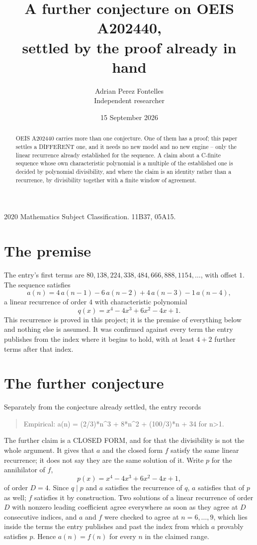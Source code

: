 \documentclass[11pt,a4paper]{article}
\title{A further conjecture on OEIS A202440,\\ \large settled by the proof already in hand}
\author{Adrian Perez Fontelles\\ \small Independent researcher}
\date{15 September 2026}
\theoremstyle{plain}
\theoremstyle{definition}
\begin{document}
\maketitle

\begin{abstract}
OEIS A202440 carries more than one conjecture. One of them has a proof; this paper settles a
DIFFERENT one, and it needs no new model and no new engine -- only the linear recurrence already
established for the sequence. A claim about a C-finite sequence whose own characteristic
polynomial is a multiple of the established one is decided by polynomial divisibility, and where
the claim is an identity rather than a recurrence, by divisibility together with a finite window
of agreement.
\end{abstract}

\noindent\small 2020 Mathematics Subject Classification. 11B37, 05A15.\normalsize

\section{The premise}

The entry's first terms are $80, 138, 224, 338, 484, 666, 888, 1154,\dots$, with offset $1$. The sequence satisfies
\[
  a(n)=4\,a(n-1) - 6\,a(n-2) + 4\,a(n-3) - 1\,a(n-4) ,
\]
a linear recurrence of order $4$ with characteristic polynomial
\[
  q(x)=x^{4} - 4 x^{3} + 6 x^{2} - 4 x + 1 .
\]
This recurrence is proved in this project; it is the premise of everything below and nothing else is assumed.
It was confirmed against every term the entry publishes from the index where it begins to hold,
with at least $4+2$ further terms after that index.

\section{The further conjecture}

Separately from the conjecture already settled, the entry records

\begin{quote}\raggedright Empirical: a(n) = (2/3)*n\^{}3 + 8*n\^{}2 + (100/3)*n + 34 for n>1.\end{quote}

The further claim is a CLOSED FORM, and for that the divisibility is not the whole argument. It
gives that $a$ and the closed form $f$ satisfy the same linear recurrence; it does not say they
are the same solution of it. Write $p$ for the annihilator of $f$,
\[
  p(x)=x^{4} - 4 x^{3} + 6 x^{2} - 4 x + 1 ,
\]
of order $D=4$. Since $q\mid p$ and $a$ satisfies the recurrence of $q$, $a$ satisfies that of
$p$ as well; $f$ satisfies it by construction. Two solutions of a linear recurrence of order $D$
with nonzero leading coefficient agree everywhere as soon as they agree at $D$ consecutive
indices, and $a$ and $f$ were checked to agree at $n=6,\dots,9$,
which lies inside the terms the entry publishes and past the index from which $a$ provably
satisfies $p$. Hence $a(n)=f(n)$ for every $n$ in the claimed range.
\end{document}
